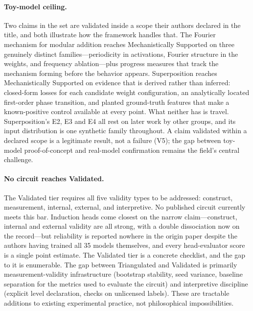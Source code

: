 \documentclass{article}
\begin{document}
\paragraph{Toy-model ceiling.} Two claims in the set are validated inside a scope their authors declared in the title, and both illustrate how the framework handles that. The Fourier mechanism for modular addition reaches Mechanistically Supported on three genuinely distinct families---periodicity in activations, Fourier structure in the weights, and frequency ablation---plus progress measures that track the mechanism forming before the behavior appears. Superposition reaches Mechanistically Supported on evidence that is derived rather than inferred: closed-form losses for each candidate weight configuration, an analytically located first-order phase transition, and planted ground-truth features that make a known-positive control available at every point. What neither has is travel. Superposition's E2, E3 and E4 all rest on later work by other groups, and its input distribution is one synthetic family throughout. A claim validated within a declared scope is a legitimate result, not a failure (V5); the gap between toy-model proof-of-concept and real-model confirmation remains the field's central challenge.

\paragraph{No circuit reaches Validated.} The Validated tier requires all five validity types to be addressed: construct, measurement, internal, external, and interpretive. No published circuit currently meets this bar. Induction heads come closest on the narrow claim---construct, internal and external validity are all strong, with a double dissociation now on the record---but reliability is reported nowhere in the origin paper despite the authors having trained all 35 models themselves, and every head-evaluator score is a single point estimate. The Validated tier is a concrete checklist, and the gap to it is enumerable. The gap between Triangulated and Validated is primarily measurement-validity infrastructure (bootstrap stability, seed variance, baseline separation for the metrics used to evaluate the circuit) and interpretive discipline (explicit level declaration, checks on unlicensed labels). These are tractable additions to existing experimental practice, not philosophical impossibilities.
\end{document}
